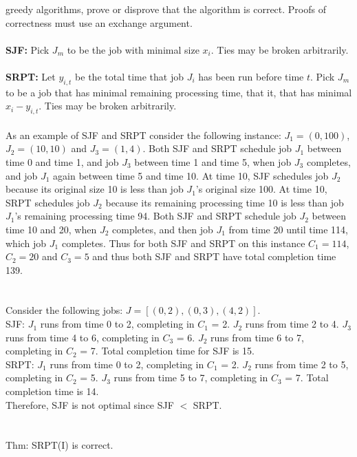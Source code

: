 \documentclass[10pt]{article}
\begin{document}
	greedy algorithms, prove or disprove that the algorithm is correct.  Proofs of correctness must use an
	exchange argument.\\
	\\
	\textbf{SJF:} Pick $J_{m}$ to be the job with minimal size $x_{i}$. Ties may be broken arbitrarily.\\
	\\
	\textbf{SRPT:} Let $y_{i,t}$ be the total time that job $J_{i}$ has been run before time $t$. Pick $J_{m}$ to be a job that has
	minimal remaining processing time, that it, that has minimal $x_{i} - y_{i,t}$. Ties may be broken arbitrarily.\\
	\\
	As an example of SJF and SRPT consider the following instance:  $J_{1} = (0, 100)$, $J_{2} = (10, 10)$ and
	$J_{3} = (1, 4)$. Both SJF and SRPT schedule job $J_{1}$ between time 0 and time 1, and job $J _{3}$ between time
	1 and time 5, when job $J_{3}$ completes, and job $J_{1}$ again between time 5 and time 10. At time 10, SJF
	schedules job $J_{2}$ because its original size 10 is less than job $J_{1}$'s original size 100.  At time 10, SRPT
	schedules job $J_{2}$ because its remaining processing time 10 is less than job $J_{1}$'s remaining processing
	time 94. Both SJF and SRPT schedule job $J_{2}$ between time 10 and 20, when $J_{2}$ completes, and then
	job $J_{1}$ from time 20 until time 114, which job $J_{1}$ completes.  Thus for both SJF and SRPT on this
	instance $C_{1} = 114$, $C_{2} = 20$ and $C_{3} = 5$ and thus both SJF and SRPT have total completion time 139.\\
	\\
	\\
	Consider the following jobs: $J = [(0,2), (0,3), (4,2)]$.\\
	SJF:
	$J_{1}$ runs from time 0 to 2, completing in $C_{1}$ = 2.
	$J_{2}$ runs from time 2 to 4.
	$J_{3}$ runs from time 4 to 6, completing in $C_{3}$ = 6.
	$J_{2}$ runs from time 6 to 7, completing in $C_{2}$ = 7.
	Total completion time for SJF is 15.\\
	SRPT:
	$J_{1}$ runs from time 0 to 2, completing in $C_{1}$ = 2.
	$J_{2}$ runs from time 2 to 5, completing in $C_{2}$ = 5.
	$J_{3}$ runs from time 5 to 7, completing in $C_{3}$ = 7.
	Total completion time is 14.\\
	Therefore, SJF is not optimal since SJF $<$ SRPT.\\
	\\
	\\
	Thm: SRPT(I) is correct.\\
\end{document}
